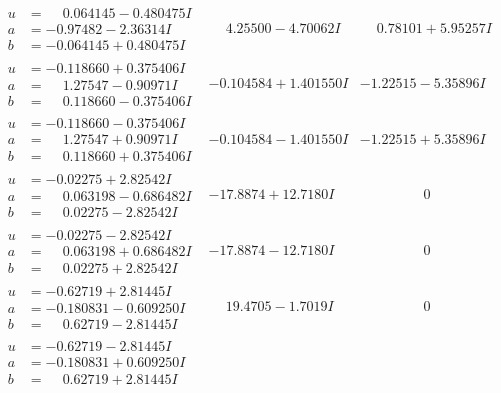 \documentclass[1p]{elsarticle_modified}
\theoremstyle{definition}
\begin{document}
$$\begin{array}{c|c|c}
\begin{aligned}
u &= \phantom{-}0.064145 - 0.480475 I \\
a &= -0.97482 - 2.36314 I \\
b &= -0.064145 + 0.480475 I\end{aligned}
 & \phantom{-}4.25500 - 4.70062 I & \phantom{-}0.78101 + 5.95257 I \\ \hline\begin{aligned}
u &= -0.118660 + 0.375406 I \\
a &= \phantom{-}1.27547 - 0.90971 I \\
b &= \phantom{-}0.118660 - 0.375406 I\end{aligned}
 & -0.104584 + 1.401550 I & -1.22515 - 5.35896 I \\ \hline\begin{aligned}
u &= -0.118660 - 0.375406 I \\
a &= \phantom{-}1.27547 + 0.90971 I \\
b &= \phantom{-}0.118660 + 0.375406 I\end{aligned}
 & -0.104584 - 1.401550 I & -1.22515 + 5.35896 I \\ \hline\begin{aligned}
u &= -0.02275 + 2.82542 I \\
a &= \phantom{-}0.063198 - 0.686482 I \\
b &= \phantom{-}0.02275 - 2.82542 I\end{aligned}
 & -17.8874 + 12.7180 I & \phantom{-0.000000 } 0 \\ \hline\begin{aligned}
u &= -0.02275 - 2.82542 I \\
a &= \phantom{-}0.063198 + 0.686482 I \\
b &= \phantom{-}0.02275 + 2.82542 I\end{aligned}
 & -17.8874 - 12.7180 I & \phantom{-0.000000 } 0 \\ \hline\begin{aligned}
u &= -0.62719 + 2.81445 I \\
a &= -0.180831 - 0.609250 I \\
b &= \phantom{-}0.62719 - 2.81445 I\end{aligned}
 & \phantom{-}19.4705 - 1.7019 I & \phantom{-0.000000 } 0 \\ \hline\begin{aligned}
u &= -0.62719 - 2.81445 I \\
a &= -0.180831 + 0.609250 I \\
b &= \phantom{-}0.62719 + 2.81445 I\end{aligned}

\end{array}$$
\end{document}
